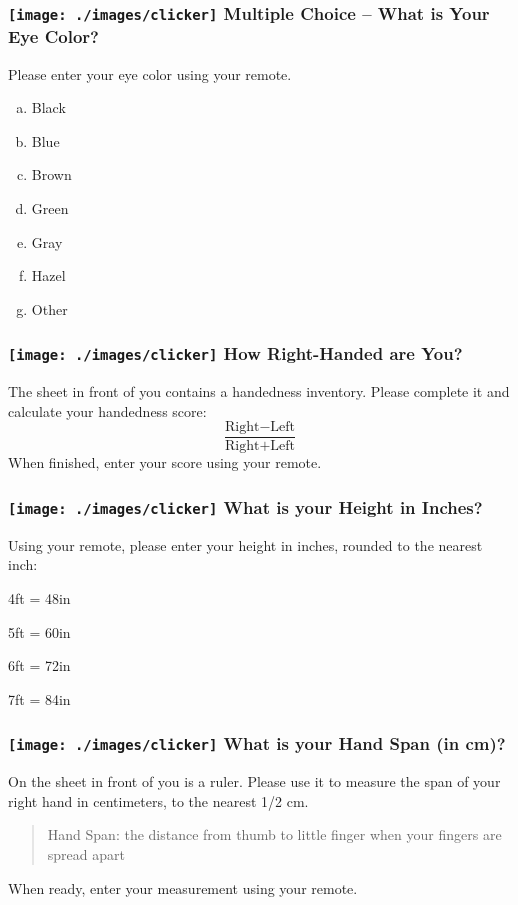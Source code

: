 \begin{frame}
\frametitle{\texttt{[image: ./images/clicker]} \hfill  Multiple Choice -- What is Your Eye Color?}
Please enter your eye color using your remote.
\begin{enumerate}[(a)]
  \item Black
  \item Blue
  \item Brown
  \item Green
  \item Gray
  \item Hazel
  \item Other
\end{enumerate}

\end{frame}


\begin{frame}
\frametitle{\texttt{[image: ./images/clicker]} \hfill  How Right-Handed are You?}

The sheet in front of you contains a handedness inventory. Please complete it and calculate your handedness score:
	$$\frac{\mbox{Right} -\mbox{Left}}{\mbox{Right} + \mbox{Left}}$$
When finished, enter your score using your remote.
\end{frame}



\begin{frame}

\frametitle{\texttt{[image: ./images/clicker]} \hfill  What is your Height in Inches?}

Using your remote, please enter your height in inches, rounded to the nearest inch:

\vspace{1em}
	4ft = 48in
	
	5ft = 60in 
	
	6ft = 72in
	
	7ft = 84in


\end{frame}



\begin{frame}

\frametitle{\texttt{[image: ./images/clicker]} \hfill  What is your Hand Span (in cm)?}

On the sheet in front of you is a ruler. Please use it to measure the span of your right hand in centimeters, to the nearest 1/2 cm. 

\vspace{2em}
\begin{quote}Hand Span: the distance from thumb to little finger when your fingers are spread apart\end{quote}

\vspace{2em}
When ready, enter your measurement using your remote.
\end{frame}

